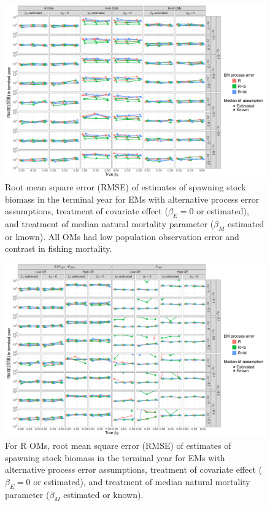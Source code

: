\documentclass[
  12pt,
]{article}
\begin{document}
\begin{landscape}
\begin{figure}
\begin{center}
\includegraphics[height = \textheight]{terminal_year_ssb_rmse_main}
\end{center}
\caption{Root mean square error (RMSE) of estimates of spawning stock biomass in the terminal year for EMs with alternative process error assumptions, treatment of covariate effect ($\beta_E = 0$ or estimated), and treatment of median natural mortality parameter ($\beta_M$ estimated or known). All OMs had low population observation error and contrast in fishing mortality.}\label{terminal_ssb_rmse}
\end{figure}
\end{landscape}

\begin{landscape}
\begin{figure}
\begin{center}
\includegraphics[height = \textheight]{terminal_year_ssb_rmse_Rom}
\end{center}
\caption{For R OMs, root mean square error (RMSE) of estimates of spawning stock biomass in the terminal year for EMs with alternative process error assumptions, treatment of covariate effect ($\beta_E = 0$ or estimated), and treatment of median natural mortality parameter ($\beta_M$ estimated or known).}\label{terminal_ssb_rmse_Rom}
\end{figure}
\end{landscape}
\end{document}
